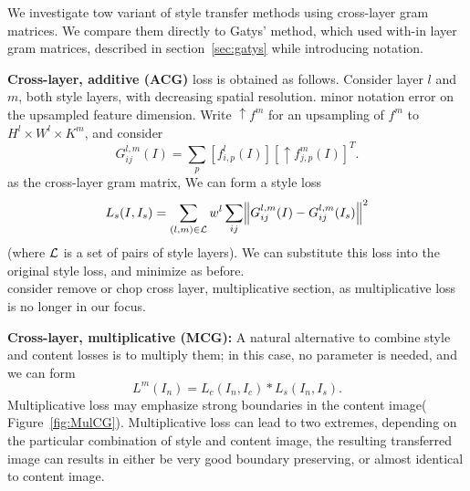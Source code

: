 \documentclass[runningheads]{llncs}
\begin{document}
We investigate tow variant of style transfer methods using cross-layer gram matrices. We compare them directly to  Gatys' method, which used with-in layer gram matrices, described in section~\ref{sec:gatys} while introducing notation. 

{\bf Cross-layer, additive (ACG)} loss is obtained as follows.  Consider layer $l$ and $m$, both style layers, with decreasing
spatial resolution.  
\todo minor notation error on the upsampled feature dimension.
Write $\uparrow f^{m}$ for an upsampling of  $f^m$ to $H^l\times W^l \times K^m$, and consider
\[
G_{ij}^{l,m}(I) = \sum_{p} \left[ f_{i,p}^l(I)\right]\left[\uparrow {f}_{j,p}^{m}(I)\right]^{T}.
\]
as the cross-layer gram matrix, We can form a style loss
\[
L_s(I, I_{s}) = \sum_{(l, m)\in {\cal L}} w^{l}\sum_{ij} \norm{G^{l,m}_{ij}(I)-G^{l,m}_{ij}(I_s)}^2
\]
(where ${\cal L}$ is a set of pairs of style layers).   We can substitute this loss into the original style loss, and
minimize as before. \\

\todo consider remove or chop cross layer, multiplicative section, as multiplicative loss is no longer in our focus.

{\bf Cross-layer, multiplicative (MCG):}  A natural alternative to combine style and content losses is to multiply them; in this
case, no parameter is needed, and we can form
\[
L^m(I_n) = L_c(I_n, I_c) *  L_s(I_n, I_s).
\]
Multiplicative loss may emphasize strong boundaries in the content image( Figure~\ref{fig:MulCG}).  Multiplicative loss can lead to two extremes, depending on the particular combination of style and content image,  the resulting transferred image can results in either be very good boundary preserving, or almost identical to content image. 

\end{document}
